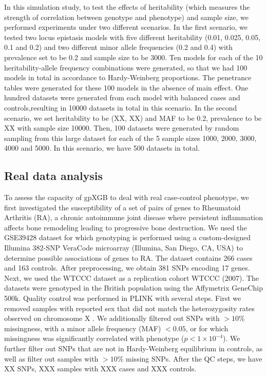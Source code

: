 \documentclass[11pt]{article}
\theoremstyle{plain}
\theoremstyle{definition}
\theoremstyle{remark}
\begin{document}
In this simulation study, to test the effects of heritability (which measures the strength of correlation between genotype and phenotype) and sample size, we performed experiments under two different scenarios. In the first scenario, we tested two locus epistasis models with five different heritability (0.01, 0.025, 0.05, 0.1 and 0.2) and two different minor allele frequencies (0.2 and 0.4) with prevalence set to be 0.2 and sample size to be 3000. Ten models for each of the 10 heritability-allele frequency combinations were generated, so that we had 100 models in total in accordance to Hardy-Weinberg proportions. The penetrance tables were generated for these 100 models in the absence of main effect. One hundred datasets were generated from each model with balanced cases and controls,resulting in 10000 datasets in total in this scenario. In the second scenario, we set heritability to be (XX, XX) and MAF to be 0.2, prevalence to be XX with sample size 10000. Then, 100 datasets were generated by random sampling from this large dataset for each of the 5 sample sizes 1000, 2000, 3000, 4000 and 5000. In this scenario, we have 500 datasets in total.\\

\subsection{Real data analysis}
To assess the capacity of gpXGB to deal with real case-control phenotype, we first investigated the susceptibility of a set of pairs of genes to Rheumatoid Arthritis (RA), a chronic autoimmune joint disease where persistent inflammation affects bone remodeling leading to progressive bone destruction. We used the GSE39428 dataset for which genotyping is performed using a custom-designed Illumina 382-SNP VeraCode microarray (Illumina, San Diego, CA, USA) to determine possible associations of genes to RA. The dataset contains 266 cases and 163 controls. After preprocessing, we obtain 381 SNPs encoding 17 genes. Next, we used the WTCCC dataset as a replication cohort WTCCC (2007). The datasets were genotyped in the British population using the Affymetrix GeneChip 500k. Quality control was performed in PLINK with several steps. First we removed samples with reported sex that did not 
match the heterozygosity rates observed on chromosome X \cite{12}. We additionally filtered out SNPs with $>10\%$ missingness,  with a minor allele frequency (MAF) $<0.05$, or for which missingness was significantly correlated with 
phenotype ($p<1\times 10^{-4}$). We further filter out SNPs that are not in Hardy-Weinberg equilibrium in controls, as well as filter out samples with $>10\%$ missing SNPs. After the QC steps, we have XX SNPs, XXX samples with XXX cases and XXX controls.\\
\end{document}
